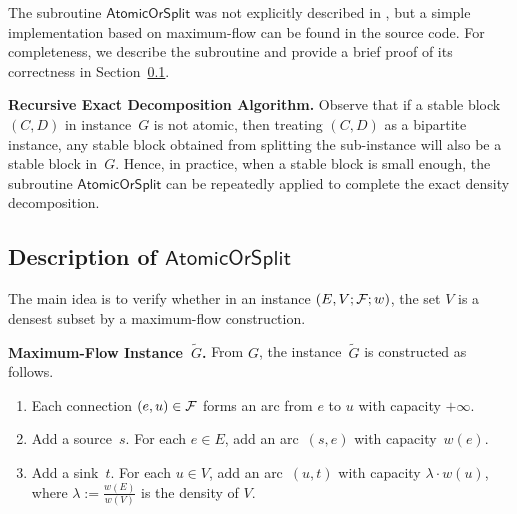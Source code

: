 The subroutine $\mathsf{AtomicOrSplit}$ was not explicitly described in \cite{DBLP:conf/www/DanischCS17}, but a simple implementation based on maximum-flow can be found in the source code. For completeness, we describe the subroutine and provide a brief proof of its correctness
in Section~\ref{sec:atomic}.

\noindent \textbf{Recursive Exact Decomposition Algorithm.}
Observe that if a stable block $(C, D)$ in instance~$G$ is not atomic,
then treating $(C, D)$ as a bipartite instance,
any stable block obtained from splitting the sub-instance 
will also be a stable block in~$G$.
Hence, in practice, when a stable block is small enough, the subroutine $\mathsf{AtomicOrSplit}$ can be repeatedly applied to complete the exact density decomposition.


\subsection{Description of $\mathsf{AtomicOrSplit}$}
\label{sec:atomic}

The main idea is to verify whether
in an instance $(E, V; \mathcal {F}; w)$,
the set $V$ is a densest subset by a maximum-flow construction.


\noindent \textbf{Maximum-Flow Instance~$\widetilde{G}$.}
From $G$, the instance~$\widetilde{G}$ is constructed as follows.

\begin{enumerate}

\item Each connection $(e, u) \in \mathcal {F}$ forms
an arc from $e$ to $u$ with capacity $+\infty$.

\item Add a source~$s$.  For each $e \in E$,
add an arc~$(s, e)$ with capacity~$w(e)$.

\item Add a sink~$t$.  For each $u \in V$,
add an arc~$(u, t)$ with capacity $\lambda \cdot w(u)$,
where $\lambda := \frac{w(E)}{w(V)}$ is the density of $V$.
\end{enumerate}




